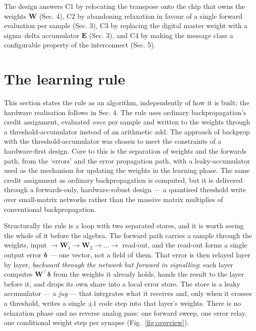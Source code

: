 \documentclass[11pt]{article}
\begin{document}
The design answers C1 by relocating the transpose onto the chip that
owns the weights \(\bm W\) (Sec. 4), C2 by abandoning relaxation in
favour of a single forward evaluation per sample (Sec. 3), C3 by
replacing the digital master weight with a sigma--delta accumulator
\(\bm E\) (Sec. 3), and C4 by making the message class a configurable
property of the interconnect (Sec. 5).

\hypertarget{sec:theory}{%
\section{The learning rule}\label{sec:theory}}

This section states the rule as an algorithm, independently of how it is
built; the hardware realisation follows in Sec. 4. The rule uses
ordinary backpropagation's credit assignment, evaluated \emph{once} per
sample and written to the weights through a threshold-accumulator
instead of an arithmetic add. The approach of backprop with the
threshold-accumulator was chosen to meet the constraints of a
hardware-first design. Core to this is the separation of weights and the
forwards path, from the `errors' and the error propagation path, with a
leaky-accumulator used as the mechanism for updating the weights in the
learning phase. The same credit assignment as ordinary backpropagation
is computed, but it is delivered through a forwards-only,
hardware-robust design --- a quantised threshold write over small-matrix
networks rather than the massive matrix multiplies of conventional
backpropagation.

Structurally the rule is a loop with two separated stores, and it is
worth seeing the whole of it before the algebra. The forward path
carries a sample through the weights, input
\(\to \bm W_1 \to \bm W_2 \to \dots \to\) read-out, and the read-out
forms a single output error \(\bm\delta\) --- one vector, not a field of
them. That error is then relayed layer by layer, \emph{backward through
the network but forward in signalling}: each layer computes
\(\bm W^{\!\top}\bm\delta\) from the weights it already holds, hands the
result to the layer before it, and drops its own share into a local
error store. The store is a leaky accumulator --- a \emph{jug} --- that
integrates what it receives and, only when it crosses a threshold,
writes a single \(\pm1\) code step into that layer's weights. There is
no relaxation phase and no reverse analog pass: one forward sweep, one
error relay, one conditional weight step per synapse (Fig.~\ref{fig:overview}).
\end{document}
